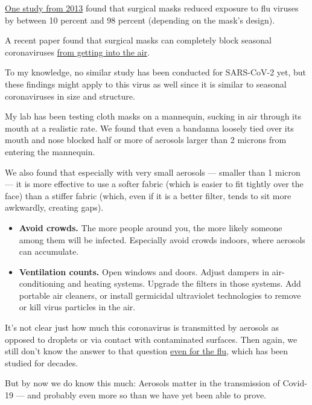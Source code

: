 \href{https://pubmed.ncbi.nlm.nih.gov/23498357/}{One study from 2013}
found that surgical masks reduced exposure to flu viruses by between 10
percent and 98 percent (depending on the mask's design).

A recent paper found that surgical masks can completely block seasonal
coronaviruses
\href{https://www.nature.com/articles/s41591-020-0843-2}{from getting
into the air}.

To my knowledge, no similar study has been conducted for SARS-CoV-2 yet,
but these findings might apply to this virus as well since it is similar
to seasonal coronaviruses in size and structure.

My lab has been testing cloth masks on a mannequin, sucking in air
through its mouth at a realistic rate. We found that even a bandanna
loosely tied over its mouth and nose blocked half or more of aerosols
larger than 2 microns from entering the mannequin.

We also found that especially with very small aerosols --- smaller than
1 micron --- it is more effective to use a softer fabric (which is
easier to fit tightly over the face) than a stiffer fabric (which, even
if it is a better filter, tends to sit more awkwardly, creating gaps).

\begin{itemize}
\tightlist
\item
  \textbf{Avoid crowds.} The more people around you, the more likely
  someone among them will be infected. Especially avoid crowds indoors,
  where aerosols can accumulate.
\end{itemize}

\begin{itemize}
\tightlist
\item
  \textbf{Ventilation counts.} Open windows and doors. Adjust dampers in
  air-conditioning and heating systems. Upgrade the filters in those
  systems. Add portable air cleaners, or install germicidal ultraviolet
  technologies to remove or kill virus particles in the air.
\end{itemize}

It's not clear just how much this coronavirus is transmitted by aerosols
as opposed to droplets or via contact with contaminated surfaces. Then
again, we still don't know the answer to that question
\href{https://journals.plos.org/plospathogens/article?id=10.1371/journal.ppat.1008704}{even
for the flu}, which has been studied for decades.

But by now we do know this much: Aerosols matter in the transmission of
Covid-19 --- and probably even more so than we have yet been able to
prove.

